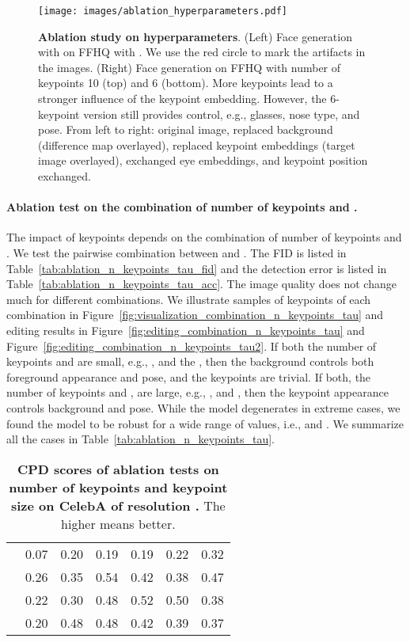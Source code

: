 \documentclass[10pt, conference, compsocconf]{IEEEtran}
\begin{document}
\begin{figure*}[t]
\begin{center}
   \texttt{[image: images/ablation\_hyperparameters.pdf]}
\end{center}
   \caption{\textbf{Ablation study on hyperparameters}. (Left) Face generation with on FFHQ with . We use the red circle to mark the artifacts in the images. (Right) Face generation on FFHQ with number of keypoints 10 (top) and 6 (bottom). More keypoints lead to a stronger influence of the keypoint embedding. However, the 6-keypoint version still provides control, e.g., glasses, nose type, and pose. From left to right: original image, replaced background (difference map overlayed), replaced keypoint embeddings (target image overlayed), exchanged eye embeddings, and keypoint position exchanged.}
\label{fig:ablation_hyperparameters}
\end{figure*}

\paragraph{Ablation test on the combination of number of keypoints and .} The impact of keypoints depends on the combination of number of keypoints and . We test the pairwise combination between  and . The FID is listed in Table~\ref{tab:ablation_n_keypoints_tau_fid} and the detection error is listed in Table~\ref{tab:ablation_n_keypoints_tau_acc}. The image quality does not change much for different combinations. We illustrate samples of keypoints of each combination in Figure~\ref{fig:visualization_combination_n_keypoints_tau} and editing results in Figure~\ref{fig:editing_combination_n_keypoints_tau} and Figure~\ref{fig:editing_combination_n_keypoints_tau2}. If both the number of keypoints and  are small, e.g., , and the , then the background controls both foreground appearance and pose, and the keypoints are trivial. If both, the number of keypoints and , are large, e.g., , and , then the keypoint appearance controls background and pose. While the model degenerates in extreme cases, we found the model to be robust for a wide range of values, i.e.,  and . We summarize all the cases in Table~\ref{tab:ablation_n_keypoints_tau}.

\begin{table*}[t]
\begin{center}
\begin{tabular}{|c|c|c|c|c|c|c|}
\hline
  &  &  &  &  &  & \\ 
\hline
 & 0.07 & 0.20 & 0.19 & 0.19 & 0.22 & 0.32\\ 
 & 0.26 & 0.35 & 0.54 & 0.42 & 0.38 & 0.47\\ 
 & 0.22 & 0.30 & 0.48 & 0.52 & 0.50 & 0.38\\ 
 & 0.20 & 0.48 & 0.48 & 0.42 & 0.39 &  0.37\\ 
\hline
\end{tabular}
\end{center}
\caption{\textbf{CPD scores of ablation tests on number of keypoints  and keypoint size  on CelebA of resolution .} The higher means better. 
}
\label{tab:ablation_n_keypoints_tau_cpd}
\end{table*}
\end{document}
